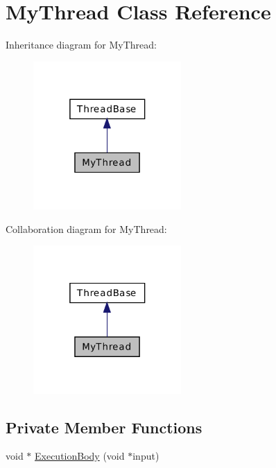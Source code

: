\hypertarget{class_my_thread}{\section{My\-Thread Class Reference}
\label{class_my_thread}
}


Inheritance diagram for My\-Thread\-:\nopagebreak
\begin{figure}[H]
\begin{center}
\leavevmode
\includegraphics[width=160pt]{class_my_thread__inherit__graph}
\end{center}
\end{figure}


Collaboration diagram for My\-Thread\-:\nopagebreak
\begin{figure}[H]
\begin{center}
\leavevmode
\includegraphics[width=160pt]{class_my_thread__coll__graph}
\end{center}
\end{figure}
\subsection*{Private Member Functions}
\begin{DoxyCompactItemize}
\item 
void $\ast$ \hyperlink{class_my_thread_a481693b2ddb2f41e0181d1f9b7de0a21}{Execution\-Body} (void $\ast$input)
\end{DoxyCompactItemize}
